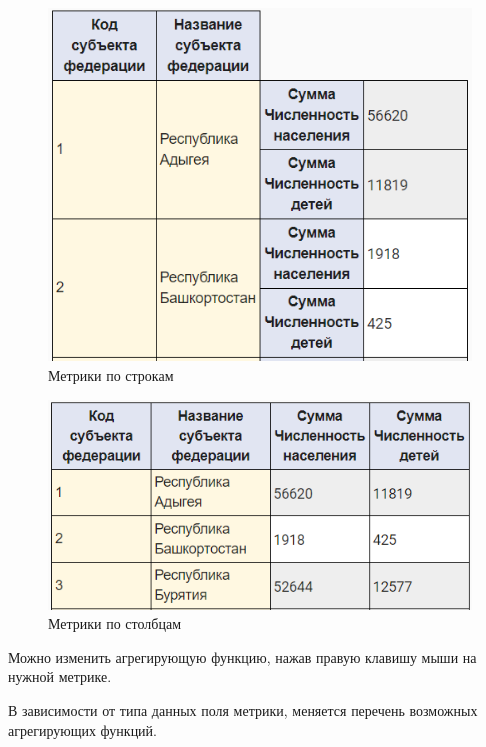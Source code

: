 \documentclass[../user-manual.tex]{subfiles}
\begin{document}
	\begin{figure}[h]
		\centering
		\includegraphics[width=\graphicswidth]{img/5-metrics-on-string.png}
		\caption{Метрики по строкам}
		\label{fig:metrics-on-string}
	\end{figure}

	\begin{figure}[h]
		\centering
		\includegraphics[width=\graphicswidth]{img/6-metrics-on-column.png}
		\caption{Метрики по столбцам}
		\label{fig:metrics-on-column}
	\end{figure}

	Можно изменить агрегирующую функцию, нажав правую клавишу мыши на нужной метрике.
	
	В зависимости от типа данных поля метрики, меняется перечень возможных агрегирующих функций.
	
\end{document}
